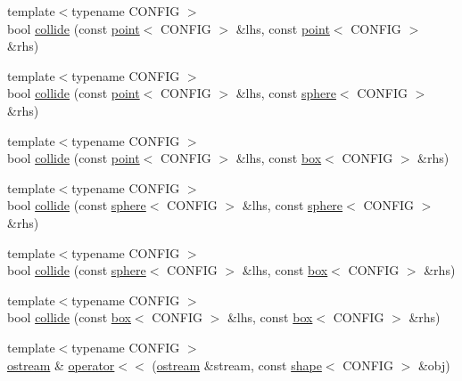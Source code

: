 \begin{DoxyCompactItemize}
\item 
{\footnotesize template$<$typename C\+O\+N\+F\+IG $>$ }\\bool \hyperlink{namespacemui_1_1geometry_ac722ff7275c45db25593fcae9b3acdb6}{collide} (const \hyperlink{classmui_1_1geometry_1_1point}{point}$<$ C\+O\+N\+F\+IG $>$ \&lhs, const \hyperlink{classmui_1_1geometry_1_1point}{point}$<$ C\+O\+N\+F\+IG $>$ \&rhs)
\item 
{\footnotesize template$<$typename C\+O\+N\+F\+IG $>$ }\\bool \hyperlink{namespacemui_1_1geometry_aa5a5160128c0f4f38e2c9f64e7367d76}{collide} (const \hyperlink{classmui_1_1geometry_1_1point}{point}$<$ C\+O\+N\+F\+IG $>$ \&lhs, const \hyperlink{classmui_1_1geometry_1_1sphere}{sphere}$<$ C\+O\+N\+F\+IG $>$ \&rhs)
\item 
{\footnotesize template$<$typename C\+O\+N\+F\+IG $>$ }\\bool \hyperlink{namespacemui_1_1geometry_a9cc781267fb931e623e79bc7f2d46d97}{collide} (const \hyperlink{classmui_1_1geometry_1_1point}{point}$<$ C\+O\+N\+F\+IG $>$ \&lhs, const \hyperlink{classmui_1_1geometry_1_1box}{box}$<$ C\+O\+N\+F\+IG $>$ \&rhs)
\item 
{\footnotesize template$<$typename C\+O\+N\+F\+IG $>$ }\\bool \hyperlink{namespacemui_1_1geometry_a074743f03df5179b768622aced179b7a}{collide} (const \hyperlink{classmui_1_1geometry_1_1sphere}{sphere}$<$ C\+O\+N\+F\+IG $>$ \&lhs, const \hyperlink{classmui_1_1geometry_1_1sphere}{sphere}$<$ C\+O\+N\+F\+IG $>$ \&rhs)
\item 
{\footnotesize template$<$typename C\+O\+N\+F\+IG $>$ }\\bool \hyperlink{namespacemui_1_1geometry_aad4f6edacb9272973a2206385d991f9b}{collide} (const \hyperlink{classmui_1_1geometry_1_1sphere}{sphere}$<$ C\+O\+N\+F\+IG $>$ \&lhs, const \hyperlink{classmui_1_1geometry_1_1box}{box}$<$ C\+O\+N\+F\+IG $>$ \&rhs)
\item 
{\footnotesize template$<$typename C\+O\+N\+F\+IG $>$ }\\bool \hyperlink{namespacemui_1_1geometry_a2325525e89b79f9b8efb6d4169333f32}{collide} (const \hyperlink{classmui_1_1geometry_1_1box}{box}$<$ C\+O\+N\+F\+IG $>$ \&lhs, const \hyperlink{classmui_1_1geometry_1_1box}{box}$<$ C\+O\+N\+F\+IG $>$ \&rhs)
\item 
{\footnotesize template$<$typename C\+O\+N\+F\+IG $>$ }\\\hyperlink{classmui_1_1ostream}{ostream} \& \hyperlink{namespacemui_1_1geometry_a0cccec0b58337c40aac12b3e79b3e077}{operator$<$$<$} (\hyperlink{classmui_1_1ostream}{ostream} \&stream, const \hyperlink{classmui_1_1geometry_1_1shape}{shape}$<$ C\+O\+N\+F\+IG $>$ \&obj)

\end{DoxyCompactItemize}

